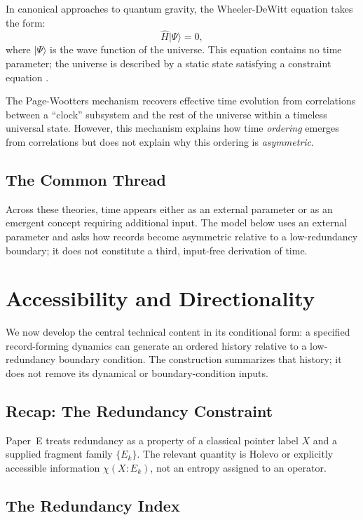 \documentclass[12pt,a4paper]{article}
\begin{document}
In canonical approaches to quantum gravity, the Wheeler-DeWitt equation takes the form:
\begin{equation}
\hat{H} |\Psi\rangle = 0,
\end{equation}
where $|\Psi\rangle$ is the wave function of the universe. This equation contains no time parameter; the universe is described by a static state satisfying a constraint equation \cite{DeWitt1967}.

The Page-Wootters mechanism \cite{PageWootters1983} recovers effective time evolution from correlations between a ``clock'' subsystem and the rest of the universe within a timeless universal state. However, this mechanism explains how time \emph{ordering} emerges from correlations but does not explain why this ordering is \emph{asymmetric}.

\subsection{The Common Thread}

Across these theories, time appears either as an external parameter or as an emergent concept requiring additional input.  The model below uses an external parameter and asks how records become asymmetric relative to a low-redundancy boundary; it does not constitute a third, input-free derivation of time.

\section{Accessibility and Directionality}
\label{sec:accessibility}

We now develop the central technical content in its conditional form: a specified record-forming dynamics can generate an ordered history relative to a low-redundancy boundary condition.  The construction summarizes that history; it does not remove its dynamical or boundary-condition inputs.

\subsection{Recap: The Redundancy Constraint}

Paper~E \cite{Liu2026PaperE} treats redundancy as a property of a classical pointer label $X$ and a supplied fragment family $\{E_k\}$.  The relevant quantity is Holevo or explicitly accessible information $\chi(X:E_k)$, not an entropy assigned to an operator.

\subsection{The Redundancy Index}
\end{document}

